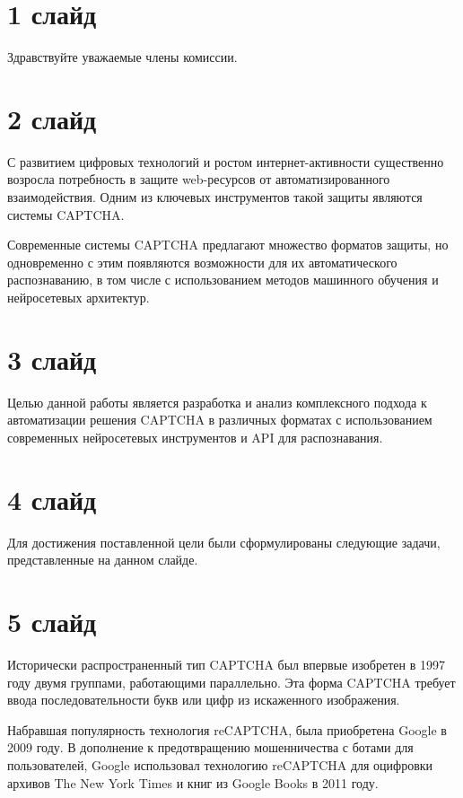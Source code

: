 \documentclass{altsu-report}
\begin{document}
\section*{1 слайд}

Здравствуйте уважаемые члены комиссии.

\section*{2 слайд}

С развитием цифровых технологий и ростом интернет-активности существенно возросла 
потребность в защите web-ресурсов от автоматизированного взаимодействия. Одним 
из ключевых инструментов такой защиты являются системы CAPTCHA.

Современные системы CAPTCHA предлагают множество форматов защиты, но одновременно 
с этим появляются возможности для их автоматического распознаванию, в том числе с 
использованием методов машинного обучения и нейросетевых архитектур.

\section*{3 слайд}

Целью данной работы является разработка и анализ комплексного подхода к 
автоматизации решения CAPTCHA в различных форматах с использованием современных 
нейросетевых инструментов и API для распознавания.

\section*{4 слайд}

Для достижения поставленной цели были сформулированы следующие задачи, 
представленные на данном слайде.

\section*{5 слайд}

Исторически распространенный тип CAPTCHA был впервые изобретен в 1997 году двумя 
группами, работающими параллельно. Эта форма CAPTCHA требует ввода 
последовательности букв или цифр из искаженного изображения.

Набравшая популярность технология reCAPTCHA, была приобретена Google в 2009 году. 
В дополнение к предотвращению мошенничества с ботами для пользователей, Google 
использовал технологию reCAPTCHA для оцифровки архивов The New York Times и книг 
из Google Books в 2011 году.
\end{document}
